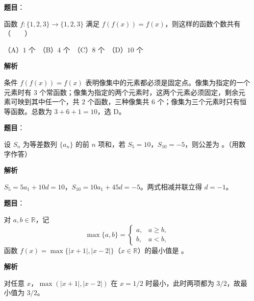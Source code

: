 \begin{answer}

\textbf{题目}：

函数 $f:\{1,2,3\}\to\{1,2,3\}$ 满足 $f(f(x))=f(x)$，则这样的函数个数共有\mbox{（　　）}

（A）$1$ 个　（B）$4$ 个　（C）$8$ 个　（D）$10$ 个

\textbf{解析}

条件 $f(f(x))=f(x)$ 表明像集中的元素都必须是固定点。像集为指定的一个元素时有 $3$ 个常函数；像集为指定的两个元素时，这两个元素必须固定，剩余元素可映到其中任一个，共 $2$ 个函数，三种像集共 $6$ 个；像集为三个元素时只有恒等函数。总数为 $3+6+1=10$，选 D。


\end{answer}
\begin{answer}

\textbf{题目}：

设 $S_n$ 为等差数列 $\{a_n\}$ 的前 $n$ 项和，若 $S_5=10$，$S_{10}=-5$，则公差为 \gkblank{}。（用数字作答）

\textbf{解析}

$S_5=5a_1+10d=10$，$S_{10}=10a_1+45d=-5$。两式相减并联立得 $d=-1$。


\end{answer}
\begin{answer}

\textbf{题目}：

对 $a,b\in\mathbb R$，记
\nopagebreak[4]
\[
\max\{a,b\}=\begin{cases}
a,&a\geqslant b,\\
b,&a<b,
\end{cases}
\]
函数 $f(x)=\max\{|x+1|,|x-2|\}$（$x\in\mathbb R$）的最小值是 \gkblank{}。

\textbf{解析}

对任意 $x$，$\max(|x+1|,|x-2|)$ 在 $x=1/2$ 时最小，此时两项都为 $3/2$，故最小值为 $3/2$。


\end{answer}
